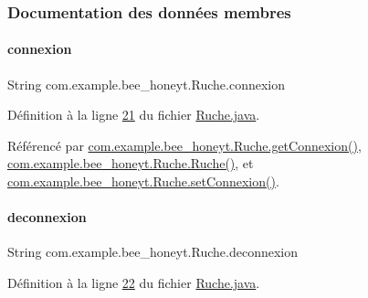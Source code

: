 \subsubsection{Documentation des données membres}
\mbox{\label{classcom_1_1example_1_1bee__honeyt_1_1_ruche_a8b1b18ca9364533f66214ed9daea875e}} 
\paragraph{\texorpdfstring{connexion}{connexion}}
{\footnotesize\ttfamily String com.\+example.\+bee\+\_\+honeyt.\+Ruche.\+connexion\hspace{0.3cm}{\ttfamily [private]}}



Définition à la ligne \hyperlink{_ruche_8java_source_l00021}{21} du fichier \hyperlink{_ruche_8java_source}{Ruche.\+java}.



Référencé par \hyperlink{_ruche_8java_source_l00111}{com.\+example.\+bee\+\_\+honeyt.\+Ruche.\+get\+Connexion()}, \hyperlink{_ruche_8java_source_l00044}{com.\+example.\+bee\+\_\+honeyt.\+Ruche.\+Ruche()}, et \hyperlink{_ruche_8java_source_l00113}{com.\+example.\+bee\+\_\+honeyt.\+Ruche.\+set\+Connexion()}.

\mbox{\label{classcom_1_1example_1_1bee__honeyt_1_1_ruche_a91168fb786c93a5233138f67b6a121ad}} 
\paragraph{\texorpdfstring{deconnexion}{deconnexion}}
{\footnotesize\ttfamily String com.\+example.\+bee\+\_\+honeyt.\+Ruche.\+deconnexion\hspace{0.3cm}{\ttfamily [private]}}



Définition à la ligne \hyperlink{_ruche_8java_source_l00022}{22} du fichier \hyperlink{_ruche_8java_source}{Ruche.\+java}.



